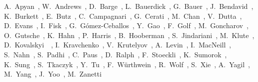 \begin{Authlist}
%
A.~Apyan~,
W.~Andrews~, 
D.~Barge~, 
L.~Bauerdick~, 
G.~Bauer~,
J.~Bendavid~,
K.~Burkett~, 
E.~Butz~,
C.~Campagnari~, 
G.~Cerati~,
M.~Chan~,
V.~Dutta~,
D.~Evans~, 
I.~Fisk~, 
G.~G\'omez-Ceballos~,
Y.~Gao~, 
F.~Golf~, 
M.~Goncharov~,
O.~Gutsche~, 
K.~Hahn~,
P.~Harris~,
B.~Hooberman~,
S.~Jindariani~,
M.~Klute~,
D.~Kovalskyi~~, 
I.~Kravchenko~,
V.~Krutelyov~, 
A.~Levin~, 
I.~MacNeill~,
S.~Nahn~,
S.~Padhi~, 
C.~Paus~,
D.~Ralph~,
F.~Stoeckli~,
K.~Sumorok~,
K.~Sung~,
S.~Tkaczyk~,
Y.~Tu~, 
F.~W\"urthwein~, 
R.~Wolf~,
S.~Xie~,
A.~Yagil~, 
M.~Yang~,
J.~Yoo~,
M.~Zanetti~
%
\end{Authlist}
